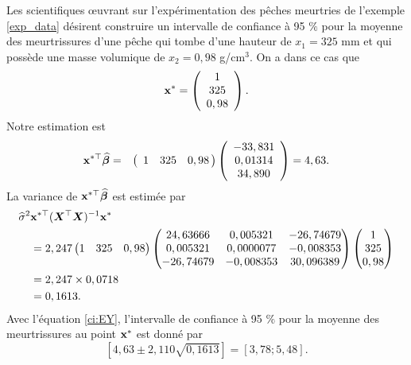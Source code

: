 \begin{exemple}
\label{exp:intconf}
Les scientifiques \oe uvrant sur l'expérimentation des pêches meurtries de l'exemple \ref{exp_data} désirent construire un intervalle de confiance à 95 $\%$ pour la moyenne des meurtrissures d'une pêche qui tombe d'une hauteur de $x_1=325$ mm et qui possède une masse volumique de  $x_2=0,98$ g/cm$^3$. 
On a dans ce cas que
$$\bold{x}^*=\left( \begin{array}{c}
1 \\
325 \\
0,98 \\
\end{array}
\right).
$$
Notre estimation est 
\begin{eqnarray*}
\bold{x}^{*\top}\widehat{\bm\beta} & = & \left(
\begin{array}{ccc}
1 & 325 &  0,98
\end{array}\!\!\right)
\left(
\begin{array}{c}
-33,831 \\
0,01314 \\
34,890
\end{array}
\right)=4,63.
\end{eqnarray*}
La variance de $\bold{x}^{*\top}\widehat{\bm\beta}$ est estimée par
\begin{align*}
\widehat{\sigma}^2&\bold{x}^{*\top}(\bm{X}^\top\bm{X})^{-1}\bold{x}^* \\
& =  2,247 
\begin{pmatrix}
1 & 325 &  0,98
\end{pmatrix}
\begin{pmatrix}
24,63666 & 0,005321 & -26,74679 \\
0,005321 & 0,0000077 & -0,008353 \\
-26,74679 & -0,008353 & 30,096389
\end{pmatrix}
\begin{pmatrix}
1 \\
325 \\
0,98 \\
\end{pmatrix}\\
& =  2,247\times 0,0718 \\
& =  0,1613.
\end{align*}
Avec l'équation \eqref{ci:EY}, l'intervalle de confiance à 95 $\%$ pour la moyenne des meurtrissures au point $\bold{x}^*$ est donné par
$$\left[4,63\pm 2,110\sqrt{0,1613}\right]=\left[3,78;5,48\right].$$
\end{exemple}

